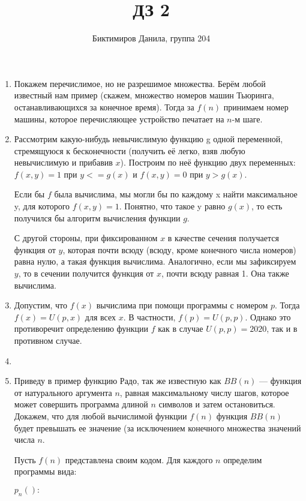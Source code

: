 \documentclass[11pt]{article}
\begin{document}
	
	\author{Биктимиров Данила, группа 204}
	\title{ДЗ 2}
	\date{}
	\maketitle
	
	\medskip
	
	\begin{enumerate}
		
		\item Покажем перечислимое, но не разрешимое множества. Берём любой известный нам пример (скажем, множество номеров машин Тьюринга, останавливающихся за конечное время). Тогда за $f(n)$ принимаем номер машины, которое перечисляющее устройство печатает на $n$-м шаге.
		\item Рассмотрим какую-нибудь невычислимую функцию g одной переменной, стремящуюся к бесконечности (получить её легко, взяв любую невычислимую и прибавив $x$). Построим по неё функцию двух переменных: $f(x,y)=1$ при $y<=g(x)$ и $f(x,y)=0$ при $y > g(x)$.
		
		Если бы $f$ была вычислима, мы могли бы по каждому x найти максимальное y, для которого $f(x,y)=1$. Понятно, что такое y равно $g(x)$, то есть получился бы алгоритм вычисления функции $g$.
		
		С другой стороны, при фиксированном $x$ в качестве сечения получается функция от $y$, которая почти всюду (всюду, кроме конечного числа номеров) равна нулю, а такая функция вычислима. Аналогично, если мы зафиксируем $y$, то в сечении получится функция от $x$, почти всюду равная 1. Она также вычислима.
		
		\item Допустим, что $f(x)$ вычислима при помощи программы с номером $p$. Тогда $f(x)=U(p,x)$ для всех $x$. В частности, $f(p)=U(p,p)$. Однако это противоречит определению функции $f$ как в случае $U(p,p)=2020$, так и в противном случае.
		\item
		\item Приведу в пример функцию Радо, так же известную как $BB(n)$ — функция от натурального аргумента $n$, равная максимальному числу шагов, которое может совершить программа длиной $n$ символов и затем остановиться. Докажем, что для любой вычислимой функции $f(n)$ функция $BB(n)$ будет превышать ее значение (за исключением конечного множества значений числа $n$.
		
		Пусть $f(n)$ представлена своим кодом. Для каждого $n$ определим программы вида:
		
		$p_n():$
		

\end{enumerate}
\end{document}

